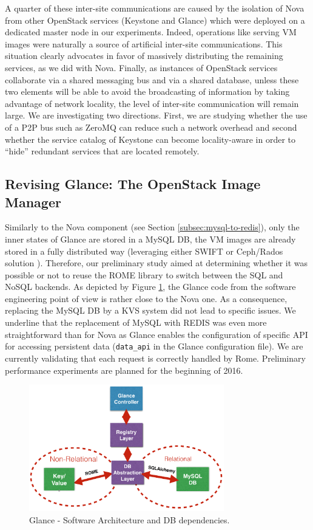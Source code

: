 A quarter of these inter-site communications are caused by the isolation of Nova
from other OpenStack services (\ie Keystone and Glance) which were deployed on a
dedicated master node in our experiments. Indeed, operations like serving VM
images were naturally a source of artificial inter-site communications. This
situation clearly advocates in favor of massively distributing the remaining
services, as we did with Nova. Finally, as instances of OpenStack services
collaborate via a shared messaging bus and via a shared database, unless these
two elements will be able to avoid the broadcasting of information by taking
advantage of network locality, the level of inter-site communication will remain
large. We are investigating two directions. First, we are studying whether the
use of a P2P bus such as ZeroMQ\cite{zeromq:2013} can reduce such a network overhead and second
whether the service catalog of Keystone can become locality-aware in order to ``hide'' redundant services that are located remotely.


\subsection{Revising Glance: The OpenStack Image Manager}
Similarly to the Nova component (see Section \ref{subsec:mysql-to-redis}), only
the inner states of Glance are stored in a MySQL DB, the VM images are already
stored in a fully distributed way (leveraging either SWIFT or Ceph/Rados
solution \cite{weil2006ceph}). Therefore, our preliminary study aimed at
determining whether it was possible or not to reuse the ROME library to switch
between the SQL and NoSQL backends. As depicted by Figure \ref{fig:glance_dbs},
the Glance code from the software engineering point of view is rather close to
the Nova one. As a consequence, replacing the MySQL DB by a KVS system did not
lead to specific issues. We underline that the replacement of MySQL with REDIS
was even more straightforward than for Nova as Glance enables the configuration
of specific API for accessing persistent data (\texttt{data\_api} in the Glance
configuration file). We are currently validating that each request is correctly
handled by Rome. Preliminary performance experiments are planned for the
beginning of 2016.


\begin{figure}[htbp]
        \centering
        \includegraphics[width=8.5cm]{figures/rome_glance.png}
        \caption{Glance - Software Architecture and DB dependencies.}
        \label{fig:glance_dbs}
\end{figure}
